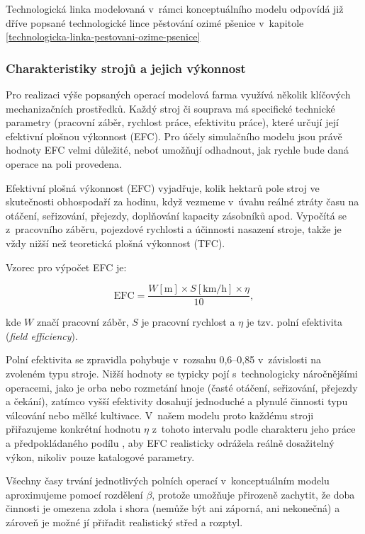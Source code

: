 \documentclass[11pt,a4paper]{article}
\begin{document}
Technologická linka modelovaná v~rámci konceptuálního modelu odpovídá již dříve popsané technologické lince pěstování ozimé pšenice v~kapitole \ref{technologicka-linka-pestovani-ozime-psenice}

\subsubsection{Charakteristiky strojů a jejich výkonnost}\label{charakteristiky-stroju}

Pro realizaci výše popsaných operací modelová farma využívá několik klíčových mechanizačních prostředků. Každý stroj či souprava má specifické technické parametry (pracovní záběr, rychlost práce, efektivitu práce), které určují její efektivní plošnou výkonnost (EFC). Pro účely simulačního modelu jsou právě hodnoty EFC velmi důležité, neboť umožňují odhadnout, jak rychle bude daná operace na poli provedena.

Efektivní plošná výkonnost (EFC) vyjadřuje, kolik hektarů pole stroj ve skutečnosti obhospodaří za hodinu, když vezmeme v~úvahu reálné ztráty času na otáčení, seřizování, přejezdy, doplňování kapacity zásobníků apod.\cite{book-machinery} Vypočítá se z~pracovního záběru, pojezdové rychlosti a účinnosti nasazení stroje, takže je vždy nižší než teoretická plošná výkonnost (TFC)\cite{book-machinery}.

Vzorec pro výpočet EFC je:

$$
\text{EFC} = \frac{W[\text{m}] \times S[\text{km/h}] \times \eta}{10},
$$

kde $W$ značí pracovní záběr, $S$ je pracovní rychlost a $\eta$ je tzv. polní efektivita (\emph{field efficiency})\cite{iowa-university-efc}.

Polní efektivita se zpravidla pohybuje v~rozsahu 0,6--0,85 v~závislosti na zvoleném typu stroje. Nižší hodnoty se typicky pojí s~technologicky náročnějšími operacemi, jako je orba nebo rozmetání hnoje (časté otáčení, seřizování, přejezdy a čekání), zatímco vyšší efektivity dosahují jednoduché a plynulé činnosti typu válcování nebo mělké kultivace. V~našem modelu proto každému stroji přiřazujeme konkrétní hodnotu $\eta$ z~tohoto intervalu podle charakteru jeho práce a předpokládaného podílu , aby EFC realisticky odrážela reálně dosažitelný výkon, nikoliv pouze katalogové parametry.

Všechny časy trvání jednotlivých polních operací v~konceptuálním modelu aproximujeme pomocí rozdělení $\beta$, protože umožňuje přirozeně zachytit, že doba činnosti je omezena zdola i shora (nemůže být ani záporná, ani nekonečná) a zároveň je možné jí přiřadit realistický střed a rozptyl\cite{wikipedia-beta-distribution}.
\end{document}
